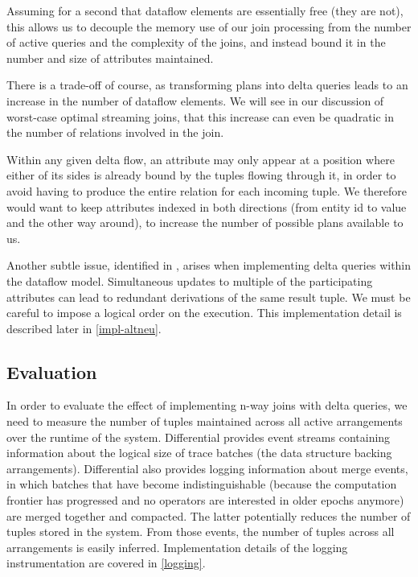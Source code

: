 \documentclass[../catalog.tex]{subfiles}
\begin{document}
Assuming for a second that dataflow elements are essentially free
(they are not), this allows us to decouple the memory use of our join
processing from the number of active queries and the complexity of the
joins, and instead bound it in the number and size of attributes
maintained.

There is a trade-off of course, as transforming plans into delta
queries leads to an increase in the number of dataflow elements. We
will see in our discussion of worst-case optimal streaming joins, that
this increase can even be quadratic in the number of relations
involved in the join.

Within any given delta flow, an attribute may only appear at a
position where either of its sides is already bound by the tuples
flowing through it, in order to avoid having to produce the entire
relation for each incoming tuple. We therefore would want to keep
attributes indexed in both directions (from entity id to value and the
other way around), to increase the number of possible plans available
to us.

Another subtle issue, identified in \cite{dogsdogsdogs}, arises when
implementing delta queries within the dataflow model. Simultaneous
updates to multiple of the participating attributes can lead to
redundant derivations of the same result tuple. We must be careful to
impose a logical order on the execution. This implementation detail is
described later in \autoref{impl-altneu}.

\subsection{Evaluation}

In order to evaluate the effect of implementing n-way joins with delta
queries, we need to measure the number of tuples maintained across all
active arrangements over the runtime of the system. Differential
provides event streams containing information about the logical size
of trace batches (the data structure backing
arrangements). Differential also provides logging information about
merge events, in which batches that have become indistinguishable
(because the computation frontier has progressed and no operators are
interested in older epochs anymore) are merged together and
compacted. The latter potentially reduces the number of tuples stored
in the system. From those events, the number of tuples across all
arrangements is easily inferred. Implementation details of the logging
instrumentation are covered in \autoref{logging}.
\end{document}
